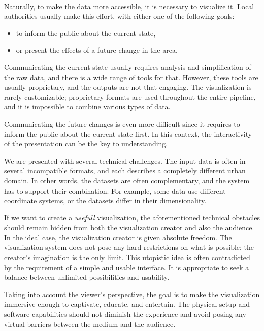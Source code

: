 \paragraph{} Naturally, to make the data more accessible, it is necessary to visualize it. Local authorities usually make this effort, with either one of the following goals: 
\begin{itemize}
    \item to inform the public about the current state,
    \item or present the effects of a future change in the area.
\end{itemize}

Communicating the current state usually requires analysis and simplification of the raw data, and there is a wide range of tools for that. However, these tools are usually proprietary, and the outputs are not that engaging. The visualization is rarely customizable; proprietary formats are used throughout the entire pipeline, and it is impossible to combine various types of data.

Communicating the future changes is even more difficult since it requires to inform the public about the current state first. In this context, the interactivity of the presentation can be the key to understanding.

We are presented with several technical challenges. The input data is often in several incompatible formats, and each describes a completely different urban domain. In other words, the datasets are often complementary, and the system has to support their combination. For example, some data use different coordinate systems, or the datasets differ in their dimensionality.

If we want to create a \textit{usefull} visualization, the aforementioned technical obstacles should remain hidden from both the visualization creator and also the audience. In the ideal case, the visualization creator is given absolute freedom. The visualization system does not pose any hard restrictions on what is possible; the creator's imagination is the only limit. This utopistic idea is often contradicted by the requirement of a simple and usable interface. It is appropriate to seek a balance between unlimited possibilities and usability.

Taking into account the viewer's perspective, the goal is to make the visualization immersive enough to captivate, educate, and entertain. The physical setup and software capabilities should not diminish the experience and avoid posing any virtual barriers between the medium and the audience.

